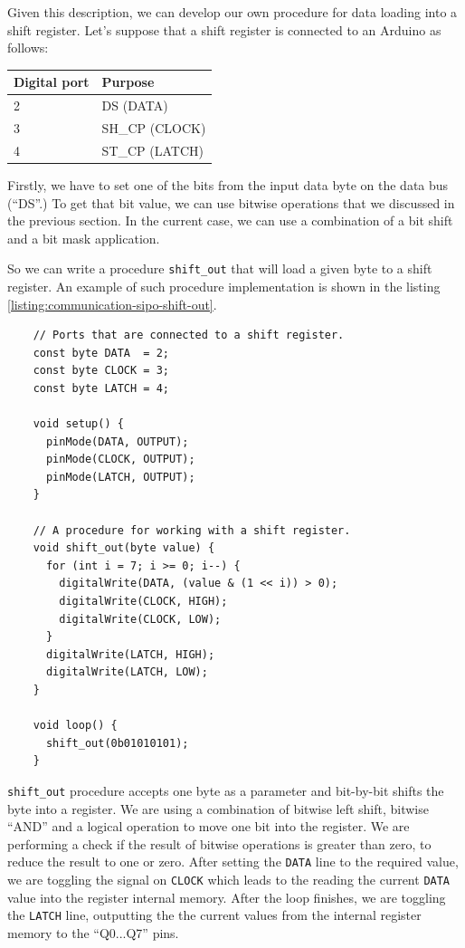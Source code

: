 \documentclass[../sparc.tex]{subfiles}
\begin{document}
Given this description, we can develop our own procedure for data loading into a
shift register.  Let's suppose that a shift register is connected to an Arduino
as follows:

\begin{tabular}{ | m{3.0cm} | m{3.0cm} | }
  \hline
  \textbf{Digital port} & \textbf{Purpose} \\
  \hline
  2 & DS (DATA)\\
  \hline
  3 & SH\_CP (CLOCK) \\
  \hline
  4 & ST\_CP (LATCH) \\
  \hline
\end{tabular}

Firstly, we have to set one of the bits from the input data byte on the data bus
(``DS''.)  To get that bit value, we can use bitwise operations that we
discussed in the previous section.  In the current case, we can use a
combination of a bit shift and a bit mask application.

So we can write a procedure \texttt{shift_out} that will load a given
byte to a shift register.  An example of such procedure implementation is shown
in the listing \ref{listing:communication-sipo-shift-out}.

\begin{listing}[H]
  \begin{verbatim}
    // Ports that are connected to a shift register.
    const byte DATA  = 2;
    const byte CLOCK = 3;
    const byte LATCH = 4;

    void setup() {
      pinMode(DATA, OUTPUT);
      pinMode(CLOCK, OUTPUT);
      pinMode(LATCH, OUTPUT);
    }

    // A procedure for working with a shift register.
    void shift_out(byte value) {
      for (int i = 7; i >= 0; i--) {
        digitalWrite(DATA, (value & (1 << i)) > 0);
        digitalWrite(CLOCK, HIGH);
        digitalWrite(CLOCK, LOW);
      }
      digitalWrite(LATCH, HIGH);
      digitalWrite(LATCH, LOW);
    }

    void loop() {
      shift_out(0b01010101);
    }
  \end{verbatim}
  \label{listing:communication-sipo-shift-out}
  \caption{A procedure for sequential loading of one byte to a shift register.}
\end{listing}

\texttt{shift_out} procedure accepts one byte as a parameter and
bit-by-bit shifts the byte into a register.  We are using a combination of
bitwise left shift, bitwise ``AND'' and a logical operation to move one bit into
the register.  We are performing a check if the result of bitwise operations is
greater than zero, to reduce the result to one or zero.  After setting the
\texttt{DATA} line to the required value, we are toggling the signal on
\texttt{CLOCK} which leads to the reading the current
\texttt{DATA} value into the register internal memory.  After the loop
finishes, we are toggling the \texttt{LATCH} line, outputting the the
current values from the internal register memory to the ``Q0...Q7'' pins.
\end{document}
